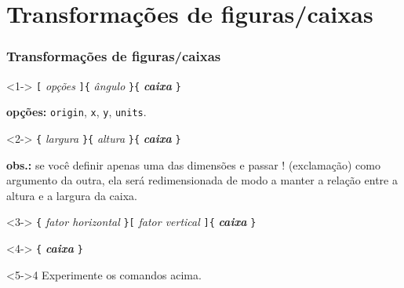 \documentclass[handout,10pt]{beamer}
\begin{document}
\section{Transformações de figuras/caixas}
\begin{frame}[fragile]
	\frametitle{Transformações de figuras/caixas}

	\begin{block}<1->{}
		\verb|[|%
			\textit{opções}%
		\verb|]{|%
			\textit{ângulo}%
		\verb|}{|%
			\textit{\textbf{caixa}}%
		\verb|}|
		
		\medskip
		
		\scriptsize
		\textbf{opções:} \texttt{origin}, \texttt{x}, \texttt{y}, \texttt{units}.
	\end{block}
		
	\begin{block}<2->{}	
		\verb|{|%
			\textit{largura}%
		\verb|}{|%
			\textit{altura}%
		\verb|}{|%
			\textit{\textbf{caixa}}%
		\verb|}|
		
		\medskip
		
		\scriptsize
		\textbf{obs.:} se você definir apenas uma das dimensões e passar ! 
		(exclamação) como argumento da outra, ela será redimensionada de modo a
		manter a relação entre a altura e a largura da caixa.
	\end{block}
		
	\begin{block}<3->{}
		\verb|{|%
			\textit{fator horizontal}%
		\verb|}[|%
			\textit{fator vertical}%
		\verb|]{|%
			\textit{\textbf{caixa}}%
		\verb|}|
	\end{block}
	
	\begin{block}<4->{}
		\verb|{|%
			\textit{\textbf{caixa}}%
		\verb|}|
	\end{block}

	\begin{atividade}<5->{4}
		Experimente os comandos acima.
	\end{atividade}
	
\end{frame}
\newsavebox{\compassbox}
\newcommand{\compass}{\usebox{\compassbox}}
\end{document}
